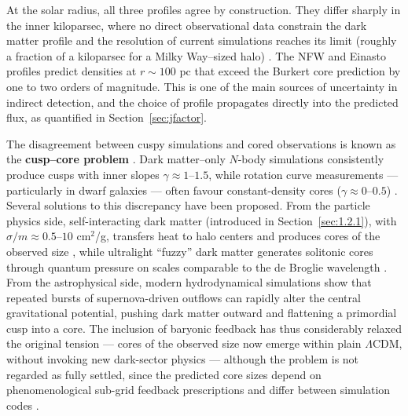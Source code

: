 At the solar radius, all three profiles agree by construction.
They differ sharply in the inner kiloparsec, where no direct observational data constrain the dark matter profile and the resolution of current simulations reaches its limit (roughly a fraction of a kiloparsec for a Milky Way--sized halo) \cite{Navarro:1996gj,Bullock:2017xww}.
The NFW and Einasto profiles predict densities at $r \sim 100$ pc that exceed the Burkert core prediction by one to two orders of magnitude. 
This is one of the main sources of uncertainty in indirect detection, and the choice of profile propagates directly into the predicted flux, as quantified in Section~\ref{sec:jfactor}.

The disagreement between cuspy simulations and cored observations is known as the \textbf{cusp--core problem} \cite{Cirelli:2024ssz,Bullock:2017xww}.
Dark matter--only $N$-body simulations consistently produce cusps with inner slopes $\gamma \approx 1$--$1.5$, while rotation curve measurements --- particularly in dwarf galaxies --- often favour constant-density cores ($\gamma \approx 0$--$0.5$) \cite{Bullock:2017xww}.
Several solutions to this discrepancy have been proposed.
From the particle physics side, self-interacting dark matter (introduced in Section~\ref{sec:1.2.1}), with $\sigma/m \approx 0.5$--$10$ cm$^2$/g, transfers heat to halo centers and produces cores of the observed size \cite{Spergel:1999mh,Tulin:2017ara,Bullock:2017xww}, while ultralight ``fuzzy'' dark matter generates solitonic cores through quantum pressure on scales comparable to the de Broglie wavelength \cite{Hu:2000ke}.
From the astrophysical side, modern hydrodynamical simulations show that repeated bursts of supernova-driven outflows can rapidly alter the central gravitational potential, pushing dark matter outward and flattening a primordial cusp into a core.
The inclusion of baryonic feedback has thus considerably relaxed the original tension --- cores of the observed size now emerge within plain $\Lambda$CDM, without invoking new dark-sector physics --- although the problem is not regarded as fully settled, since the predicted core sizes depend on phenomenological sub-grid feedback prescriptions and differ between simulation codes \cite{Bullock:2017xww}.

